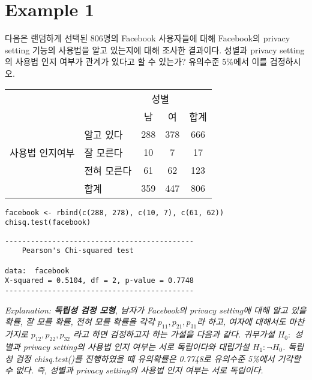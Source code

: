 \documentclass{article}
\begin{document}
\pagestyle{fancy}

\section*{Example 1}
다음은 랜덤하게 선택된 806명의 Facebook 사용자들에 대해 Facebook의 privacy
setting 기능의 사용법을 알고 있는지에 대해 조사한 결과이다. 성별과 privacy setting의 사용법 인지 여부가 관계가 있다고 할 수 있는가? 유의수준 5\%에서 이를 검정하시오.
\begin{table}[htb!]
\centering
\begin{tabularx}{0.6\textwidth}{@{\extracolsep{\fill}}llccc}               &        & \multicolumn{2}{c}{성별} &     \\ \cline{3-4}
                                              &        & 남          & 여         & 합계  \\ \cline{2-5} 
\multicolumn{1}{c}{\multirow{3}{*}{사용법 인지여부}} & 알고 있다  & 288        & 378       & 666 \\
\multicolumn{1}{c}{}                          & 잘 모른다  & 10         & 7         & 17  \\
\multicolumn{1}{c}{}                          & 전혀 모른다 & 61         & 62        & 123 \\ \cline{2-5} 
                                              & 합계     & 359        & 447       & 806
\end{tabularx}
\end{table}

\begin{lstlisting}[style={r-style}]
facebook <- rbind(c(288, 278), c(10, 7), c(61, 62))
chisq.test(facebook)
\end{lstlisting}
\begin{lstlisting}[style={out-style}]
--------------------------------------------
	Pearson's Chi-squared test

data:  facebook
X-squared = 0.5104, df = 2, p-value = 0.7748
--------------------------------------------
\end{lstlisting}
\emph{Explanation: \textbf{독립성 검정 모형}, 남자가 Facebook의 privacy setting에 대해 알고 있을 확률, 잘 모를 확률, 전혀 모를 확률을 각각 $p_{11}, p_{21}, p_{31}$라 하고, 여자에 대해서도 마찬가지로 $p_{12}, p_{22}, p_{32}$ 라고 하면 검정하고자 하는 가설을 다음과 같다. 귀무가설 $H_0:$ 성별과 privacy setting의 사용법 인지 여부는 서로 독립이다와  대립가설 $H_1: \neg H_0$. 독립성 검정 chisq.test()를 진행하였을 때 유의확률은 0.7748로 유의수준 5\%에서 기각할 수 없다. 즉, 성별과 privacy setting의 사용법 인지 여부는 서로 독립이다.} \\
\end{document}
